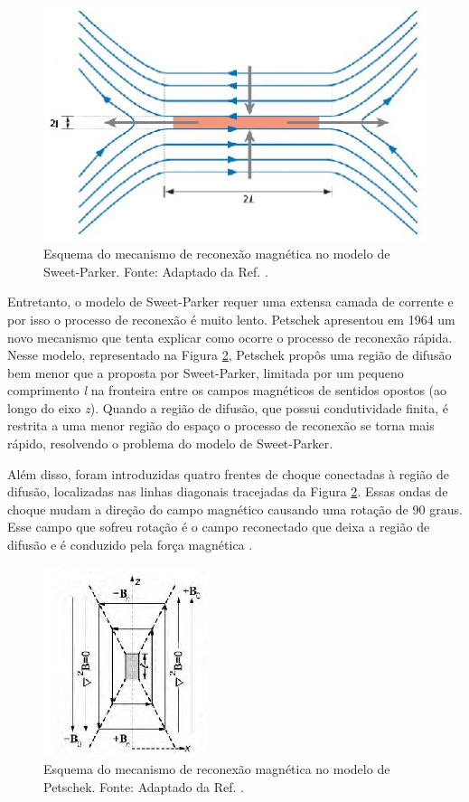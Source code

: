 \begin{figure}
	\begin{center}
		\includegraphics[scale=0.55]{sweetparker.jpg}
		\caption{Esquema do mecanismo de reconexão magnética no modelo de Sweet-Parker. Fonte: Adaptado da Ref. \cite{zweibel2009}. }
		\label{sweetparker}
	\end{center}
\end{figure} 

Entretanto, o modelo de Sweet-Parker requer uma extensa camada de corrente e por isso o processo de reconexão é muito lento. Petschek apresentou em 1964 um novo mecanismo que tenta explicar como ocorre o processo de reconexão rápida. Nesse modelo, representado na Figura \ref{petschek}, Petschek propôs uma região de difusão bem menor que a proposta por Sweet-Parker, limitada por um pequeno comprimento \textit{l} na fronteira entre os campos magnéticos de sentidos opostos (ao longo do eixo \textit{z}). Quando a região de difusão, que possui condutividade finita, é restrita a uma menor região do espaço o processo de reconexão se torna mais rápido, resolvendo o problema do modelo de Sweet-Parker. 

Além disso, foram introduzidas quatro frentes de choque conectadas à região de difusão, localizadas nas linhas diagonais tracejadas da Figura \ref{petschek}. Essas ondas de choque mudam a direção do campo magnético causando uma rotação de 90 graus. Esse campo que sofreu rotação é o campo reconectado que deixa a região de difusão e é conduzido pela força magnética \cite{treumann}. 

\begin{figure}
	\begin{center}
		\includegraphics[scale=0.9]{petschek.jpg}
		\caption{Esquema do mecanismo de reconexão magnética no modelo de Petschek. Fonte: Adaptado da Ref. \cite{treumann}. }
		\label{petschek}
	\end{center}
\end{figure} 


